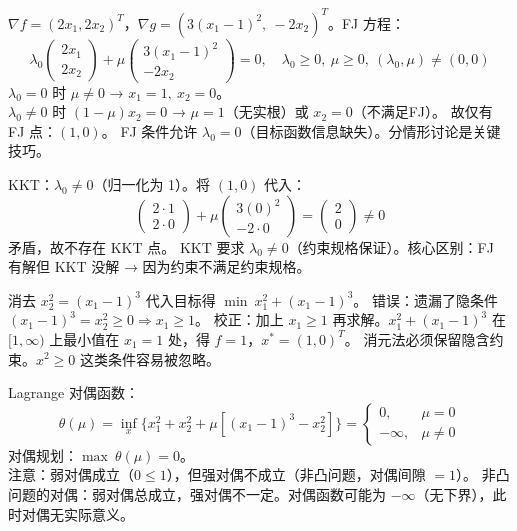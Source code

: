   {$\nabla f = (2x_1, 2x_2)^T$，$\nabla g = (3(x_1-1)^2,\ -2x_2)^T$。FJ 方程：
  \[
  \lambda_0 \begin{pmatrix}2x_1\\2x_2\end{pmatrix}
  + \mu \begin{pmatrix}3(x_1-1)^2\\-2x_2\end{pmatrix} = 0,\quad
  \lambda_0\ge 0,\ \mu\ge 0,\ (\lambda_0,\mu)\neq(0,0)
  \]
  $\lambda_0=0$ 时 $\mu\neq 0$ → $x_1=1,\ x_2=0$。\\
  $\lambda_0\neq 0$ 时 $(1-\mu)x_2=0$ → $\mu=1$（无实根）或 $x_2=0$（不满足FJ）。
  故仅有 FJ 点：$(1,0)$。}
  {FJ 条件允许 $\lambda_0=0$（目标函数信息缺失）。分情形讨论是关键技巧。}
  {\par\vspace{4pt}}
  {KKT：$\lambda_0\neq 0$（归一化为 1）。将 $(1,0)$ 代入：
  \[
  \begin{pmatrix}2\cdot 1\\2\cdot 0\end{pmatrix}
  + \mu\begin{pmatrix}3(0)^2\\-2\cdot 0\end{pmatrix} = \begin{pmatrix}2\\0\end{pmatrix} \neq 0
  \]
  矛盾，故不存在 KKT 点。}
  {KKT 要求 $\lambda_0\neq 0$（约束规格保证）。核心区别：FJ 有解但 KKT 没解 → 因为约束不满足约束规格。}
  {\par\vspace{4pt}}
  {消去 $x_2^2 = (x_1-1)^3$ 代入目标得 $\min\ x_1^2 + (x_1-1)^3$。
  错误：遗漏了隐条件 $(x_1-1)^3 = x_2^2 \ge 0 \Rightarrow x_1 \ge 1$。
  校正：加上 $x_1 \ge 1$ 再求解。$x_1^2+(x_1-1)^3$ 在 $[1,\infty)$ 上最小值在 $x_1=1$ 处，得 $f=1$，$x^*=(1,0)^T$。}
  {消元法必须保留隐含约束。$x^2 \ge 0$ 这类条件容易被忽略。}
  {\par\vspace{4pt}}
  {Lagrange 对偶函数：
  \[
  \theta(\mu) = \inf_{x}\{x_1^2+x_2^2 + \mu[(x_1-1)^3 - x_2^2]\}
  = \begin{cases}
  0, & \mu = 0 \\
  -\infty, & \mu \neq 0
  \end{cases}
  \]
  对偶规划：$\max\ \theta(\mu) = 0$。\\
  注意：弱对偶成立（$0 \le 1$），但强对偶不成立（非凸问题，对偶间隙 $=1$）。}
  {非凸问题的对偶：弱对偶总成立，强对偶不一定。对偶函数可能为 $-\infty$（无下界），此时对偶无实际意义。}
  {\par\vspace{4pt}}